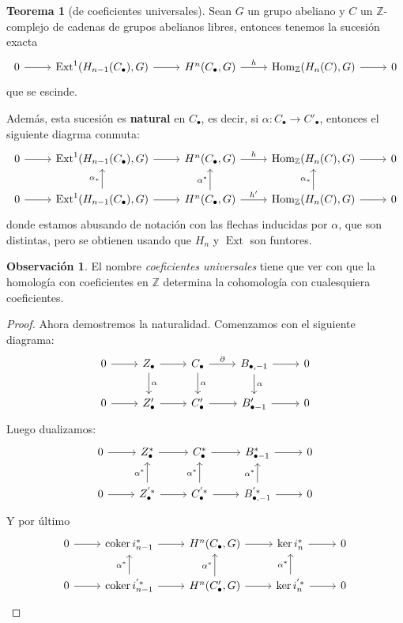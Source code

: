 \documentclass[spanish]{book}
\theoremstyle{definition}
\newtheorem*{obs}{Observación}
\newtheorem*{teo}{Teorema}
\newcommand{\Z}{\mathbb{Z}}
\DeclareMathOperator{\coker}{coker}
\DeclareMathOperator{\Hom}{Hom}
\DeclareMathOperator{\Ext}{Ext}
\begin{document}
\begin{teo}[de coeficientes universales]
	Sean $G$ un grupo abeliano y $C$ un $\Z$-complejo de cadenas de grupos abelianos libres, entonces tenemos la sucesión exacta
	\[\begin{tikzcd}
		0\arrow[r]&\Ext^1(H_{n-1}(C_\bullet),G)\arrow[r]&H^n(C_\bullet,G)\arrow[r,"h"]&\Hom_\Z(H_n(C),G)\arrow[r]&0
	\end{tikzcd}\]
	que se escinde.
	
	Además, esta sucesión es \textbf{natural} en $C_\bullet$, es decir, si $	\alpha:C_\bullet\to C'_\bullet$, entonces el siguiente diagrma conmuta:
	\[\begin{tikzcd}
		0\arrow[r]&\Ext^1(H_{n-1}(C_\bullet),G)\arrow[r]&H^n(C_\bullet,G)\arrow[r,"h"]&\Hom_\Z(H_n(C),G)\arrow[r]&0\\
		0\arrow[r]&\Ext^1(H_{n-1}(C_\bullet),G)\arrow[r]\arrow[u,"\alpha_*"]&H^n(C_\bullet,G)\arrow[r,"h'"]\arrow[u,"\alpha^*"]&\Hom_\Z(H_n(C),G)\arrow[r]\arrow[u,"\alpha_*"]&0
	\end{tikzcd}\]
	donde estamos abusando de notación con las flechas inducidas por $\alpha$, que son distintas, pero se obtienen usando que $H_n$ y $\Ext$ son funtores.
\end{teo}
\begin{obs}
	El nombre \textit{coeficientes universales} tiene que ver con que la homología con coeficientes en $\Z$ determina la cohomología con cualesquiera coeficientes.
\end{obs}
\begin{proof}
	Ahora demostremos la naturalidad. Comenzamos con el siguiente diagrama:
	\[\begin{tikzcd}
		0\arrow[r]&Z_\bullet\arrow[r]\arrow[d,"\alpha"]&C_\bullet\arrow[r,"\partial"]\arrow[d,"\alpha"]&B_{\bullet,-1}\arrow[r]\arrow[d,"\alpha"]&0\\
		0\arrow[r]&Z'_\bullet\arrow[r]&C_\bullet'\arrow[r]&B'_{\bullet-1}\arrow[r]&0
	\end{tikzcd}\]
	Luego dualizamos:
	\[\begin{tikzcd}
		0\arrow[r]&Z^*_\bullet\arrow[r]&C^*_\bullet\arrow[r]&B^*_{\bullet-1}\arrow[r]&0\\
		0\arrow[r]&Z^{'*}_\bullet\arrow[r]\arrow[u,"\alpha^*"]&C^{'*}_\bullet\arrow[r]\arrow[u,"\alpha^*"]&B^{'*}_{\bullet,-1}\arrow[r]\arrow[u,"\alpha^*"]&0
	\end{tikzcd}\]
	Y por último
	\[\begin{tikzcd}
		0\arrow[r]&\coker i^*_{n-1}\arrow[r]&H^n(C_\bullet,G)\arrow[r]&\ker i^*_n\arrow[r]&0\\
		0\arrow[r]&\coker i^{'*}_{n-1}\arrow[r]\arrow[u,"\alpha^*"]&H^n(C'_\bullet,G)\arrow[r]\arrow[u,"\alpha^*"]&\ker i^{'*}_n\arrow[r]\arrow[u,"\alpha^*"]&0
	\end{tikzcd}\]
\end{proof}
\end{document}
